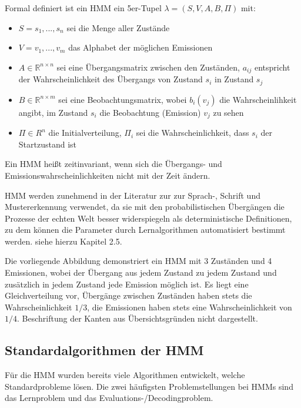 Formal definiert ist ein HMM ein 5er-Tupel $\lambda= (S, V, A, B, \Pi)$ mit:

\begin{itemize}
 \item $S = {s_1,..., s_n}$ sei die Menge aller Zustände
 \item $V = {v_1,..., v_m}$ das Alphabet der möglichen Emissionen
 \item $A \in \mathbb{R}^{n \times n}$ sei eine Übergangsmatrix zwischen den Zuständen, $a_{ij}$ entspricht der Wahrscheinlichkeit des Übergangs von Zustand $s_i$ in Zustand $s_j$
 \item $B \in \mathbb{R}^{n\times m}$ sei eine Beobachtungsmatrix, wobei $b_i(v_j)$ die Wahrscheinlihkeit angibt, im Zustand $s_i$ die Beobachtung (Emission) $v_j$ zu sehen
 \item $\Pi \in R^n$ die Initialverteilung, $\Pi_i$ sei die Wahrscheinlichkeit, dass $s_i$ der Startzustand ist
\end{itemize}

Ein HMM heißt zeitinvariant, wenn sich die Übergangs- und Emissionswahrscheinlichkeiten nicht mit der Zeit ändern.

HMM werden zunehmend in der Literatur zur zur Sprach-, Schrift und Mustererkennung verwendet, da sie mit den probabilistischen Übergängen die Prozesse der echten Welt besser widerspiegeln als deterministische Definitionen, zu dem können die Parameter durch Lernalgorithmen automatisiert bestimmt werden.
 siehe hierzu Kapitel 2.5.




Die vorliegende Abbildung demonstriert ein HMM mit 3 Zuständen und 4 Emissionen, wobei der Übergang aus jedem Zustand zu jedem Zustand und zusätzlich in jedem Zustand jede Emission möglich ist.
Es liegt eine Gleichverteilung vor, Übergänge zwischen Zuständen haben stets die Wahrscheinlichkeit $1/3$, die Emissionen haben stets eine Wahrscheinlichkeit von $1/4$.
 Beschriftung der Kanten aus Übersichtsgründen nicht dargestellt.


\subsection{Standardalgorithmen der HMM}

Für die HMM wurden bereits viele Algorithmen entwickelt, welche Standardprobleme lösen.
 Die zwei häufigsten Problemstellungen bei HMMs sind das Lernproblem und das Evaluations-/Decodingproblem.

